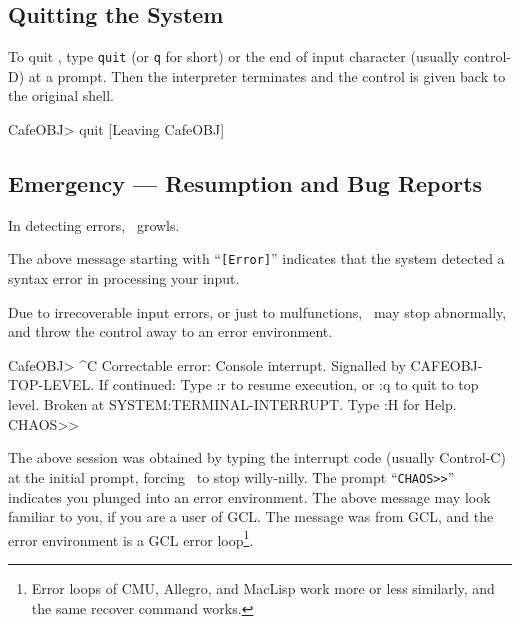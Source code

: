 \documentclass[a4paper]{memoir}
\begin{document}

\subsection{Quitting the System}

To quit \cafeobj, type \verb|quit| (or \verb|q| for short) or the end of
input character (usually control-D) at a prompt.
Then the interpreter terminates and the control is given back to
the original shell.
\begin{vvtm}
\begin{ccode}
  CafeOBJ> quit
  [Leaving CafeOBJ]
\end{ccode}
\end{vvtm}

\subsection{Emergency --- Resumption and Bug Reports}

In detecting errors, \cafeobj~growls.
\begin{vvtm}
\begin{ccode}
  CafeOBJ> module ERROR }
  [Error]: was expecting the symbol `{' not `}' .

  CafeOBJ> 
\end{ccode}
\end{vvtm}
The above message starting with ``\verb|[Error]|'' indicates that
the system detected a syntax error in processing your input.

Due to irrecoverable input errors, or just to mulfunctions, \cafeobj
~may stop abnormally, and throw the control away to an error environment.
\begin{vvtm}
\begin{ccode}
  CafeOBJ> ^C
  Correctable error: Console interrupt.
  Signalled by CAFEOBJ-TOP-LEVEL.
  If continued: Type :r to resume execution, or :q to quit to top level.
  Broken at SYSTEM:TERMINAL-INTERRUPT.  Type :H for Help.
  CHAOS>>
\end{ccode}
\end{vvtm}
The above session was obtained by typing the interrupt code (usually
Control-C) at the initial prompt, forcing \cafeobj~to stop willy-nilly.
The prompt ``\verb|CHAOS>>|'' indicates you plunged into an error
environment. The above message may look familiar to you, if you are
a user of GCL. The message was from GCL, and the error
environment is a GCL error loop\footnote{
Error loops of CMU, Allegro, and MacLisp work more or less similarly,
and the same recover command  works.
}.
\end{document}
